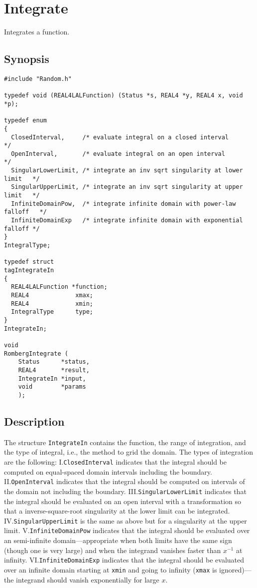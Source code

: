 \documentclass{article}
\begin{document}
\section{Integrate}

Integrates a function.

\subsection{Synopsis}
\begin{verbatim}
#include "Random.h"

typedef void (REAL4LALFunction) (Status *s, REAL4 *y, REAL4 x, void *p);

typedef enum
{
  ClosedInterval,     /* evaluate integral on a closed interval             */
  OpenInterval,       /* evaluate integral on an open interval              */
  SingularLowerLimit, /* integrate an inv sqrt singularity at lower limit   */
  SingularUpperLimit, /* integrate an inv sqrt singularity at upper limit   */
  InfiniteDomainPow,  /* integrate infinite domain with power-law falloff   */
  InfiniteDomainExp   /* integrate infinite domain with exponential falloff */
}
IntegralType;

typedef struct
tagIntegrateIn
{
  REAL4LALFunction *function;
  REAL4             xmax;
  REAL4             xmin;
  IntegralType      type;
}
IntegrateIn;

void
RombergIntegrate (
    Status      *status,
    REAL4       *result,
    IntegrateIn *input,
    void        *params
    );
\end{verbatim}

\subsection{Description}

The structure \verb+IntegrateIn+ contains the function, the range of
integration, and the type of integral, i.e., the method to grid the domain.
The types of integration are the following: I.\@ \verb+ClosedInterval+
indicates that the integral should be computed on equal-spaced domain
intervals including the boundary.  II.\@ \verb+OpenInterval+ indicates that
the integral should be computed on intervals of the domain not including the
boundary.  III.\@ \verb+SingularLowerLimit+ indicates that the integral should
be evaluated on an open interval with a transformation so that a
inverse-square-root singularity at the lower limit can be integrated.
IV.\@ \verb+SingularUpperLimit+ is the same as above but for a singularity at
the upper limit.  V.\@ \verb+InfiniteDomainPow+ indicates that the integral
should be evaluated over an semi-infinite domain---appropriate when both
limits have the same sign (though one is very large) and when the integrand
vanishes faster than $x^{-1}$ at infinity.  VI.\@ \verb+InfiniteDomainExp+
indicates that the integral should be evaluated over an infinite domain
starting at \verb+xmin+ and going to infinity (\verb+xmax+ is ignored)---the
integrand should vanish exponentially for large $x$.
\end{document}
